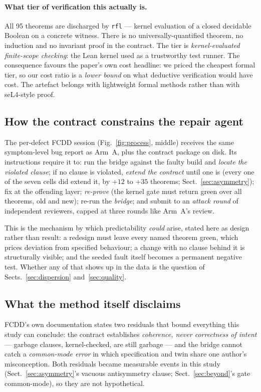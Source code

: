 \documentclass[runningheads]{llncs}
\begin{document}
\paragraph{What tier of verification this actually is.} All 95 theorems are
discharged by \texttt{rfl} --- kernel evaluation of a closed decidable
Boolean on a concrete witness. There is no universally-quantified theorem, no
induction and no invariant proof in the contract. The tier is
\emph{kernel-evaluated finite-scope checking}: the Lean kernel used as a
trustworthy test runner. The consequence favours the paper's own cost
headline: we priced the cheapest formal tier, so our cost ratio is a
\emph{lower bound} on what deductive verification would have cost. The
artefact belongs with lightweight formal methods rather than with seL4-style
proof.

\subsection{How the contract constrains the repair agent}

The per-defect FCDD session (Fig.~\ref{fig:process}, middle) receives the
same symptom-level bug report as Arm~A, plus the contract package on disk.
Its instructions require it to: run the bridge against the faulty build and
\emph{locate the violated clause}; if no clause is violated, \emph{extend the
contract} until one is (every one of the seven cells did extend it, by $+12$
to $+35$ theorems; Sect.~\ref{sec:asymmetry}); fix at the offending layer;
\emph{re-prove} (the kernel gate must return green over all theorems, old and
new); re-run the \emph{bridge}; and submit to an \emph{attack round} of
independent reviewers, capped at three rounds like Arm~A's review.

This is the mechanism by which predictability \emph{could} arise, stated here
as design rather than result: a redesign must leave every named theorem
green, which prices deviation from specified behaviour; a change with no
clause behind it is structurally visible; and the seeded fault itself becomes
a permanent negative test. Whether any of that shows up in the data is the
question of Sects.~\ref{sec:dispersion} and~\ref{sec:quality}.

\subsection{What the method itself disclaims}

FCDD's own documentation states two residuals that bound everything this
study can conclude: the contract establishes \emph{coherence, never
correctness of intent} --- garbage clauses, kernel-checked, are still garbage
--- and the bridge cannot catch a \emph{common-mode error} in which
specification and twin share one author's misconception. Both residuals
became measurable events in this study (Sect.~\ref{sec:asymmetry}'s vacuous
antisymmetry clause; Sect.~\ref{sec:beyond}'s gate common-mode), so they are
not hypothetical.
\end{document}
